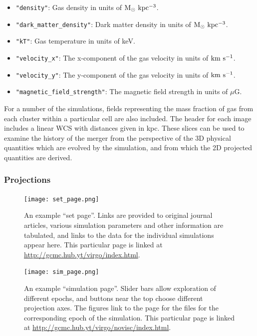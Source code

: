 \documentclass{emulateapj}
\newcommand{\code}[1]{\texttt{#1}}
\begin{document}
\begin{itemize}
\item \code{"density"}: Gas density in units of $\rm{M_\odot~kpc^{-3}}$.
\item \code{"dark\_matter\_density"}: Dark matter density in units of $\rm{M_\odot~kpc^{-3}}$.
\item \code{"kT"}: Gas temperature in units of keV.
\item \code{"velocity\_x"}: The x-component of the gas velocity in units of $\rm{km~s^{-1}}$.
\item \code{"velocity\_y"}: The y-component of the gas velocity in units of $\rm{km~s^{-1}}$.
\item \code{"magnetic\_field\_strength"}: The magnetic field strength in units of $\mu$G.
\end{itemize}

For a number of the simulations, fields representing the mass fraction of gas from each cluster within a particular cell are also included. The header for each image includes a linear WCS with distances given in kpc. These slices can be used to examine the history of the merger from the perspective of the 3D physical quantities which are evolved by the simulation, and from which the 2D projected quantities are derived.

\subsubsection{Projections}\label{sec:projections}

\begin{figure}
\begin{center}
\texttt{[image: set\_page.png]}
\caption{An example ``set page''. Links are provided to original journal articles, various simulation parameters and other information are tabulated, and links to the data for the individual simulations appear here. This particular page is linked at \url{http://gcmc.hub.yt/virgo/index.html}.}
\end{center}
\end{figure}

\begin{figure}
\begin{center}
\texttt{[image: sim\_page.png]}
\caption{An example ``simulation page''. Slider bars allow exploration of different epochs, and buttons near the top choose different projection axes. The figures link to the page for the files for the corresponding epoch of the simulation. This particular page is linked at \url{http://gcmc.hub.yt/virgo/novisc/index.html}.}
\end{center}
\end{figure}
\end{document}
